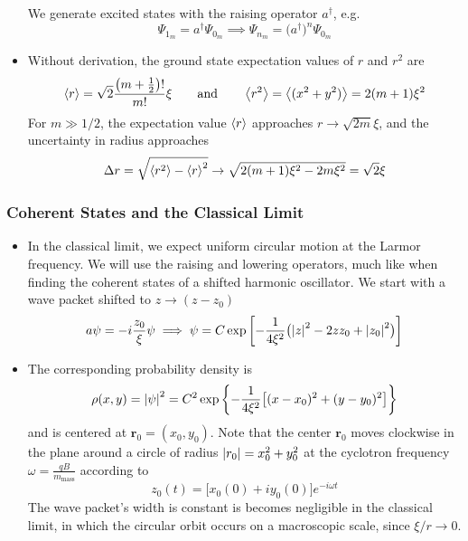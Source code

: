\documentclass[11pt, a4paper]{article}
\newcommand{\eqtext}[1]{\qquad \text{#1} \qquad}
\renewcommand{\vec}[1]{\bm{#1}}  %
\renewcommand{\r}{\vec{r}}  %
\newcommand{\p}{\psi}  %
\renewcommand{\P}{\Psi}  %
\begin{document}
\begin{itemize}
	We generate excited states with the raising operator $ a^{\dagger} $, e.g.
	\begin{equation*}
		\P_{1_{m}} = a^{\dagger}\P_{0_{m}} \implies \P_{n_{m}} = \big(a^{\dagger}\big)^{n} \P_{0_{m}}
	\end{equation*}
	
	\item Without derivation, the ground state expectation values of $ r $ and $ r^{2} $ are 
	\begin{align*}
		\ev{r} = \sqrt{2}\frac{\big(m + \tfrac{1}{2}\big)!}{m!}\xi \eqtext{and} \ev{r^{2}} = \ev{(x^{2} + y^{2})} = 2(m+1)\xi^{2}
	\end{align*}
	For $ m \gg 1/2 $, the expectation value $ \ev{r} $ approaches $ r \to \sqrt{2m}\xi $, and the uncertainty in radius approaches
	\begin{equation*}
		\Delta r = \sqrt{\ev{r^{2}} - \ev{r}^{2}} \to \sqrt{2(m+1)\xi^{2} - 2m\xi^{2}} = \sqrt{2} \xi
	\end{equation*}
	
\end{itemize}

\subsubsection{Coherent States and the Classical Limit}
\begin{itemize}
	\item In the classical limit, we expect uniform circular motion at the Larmor frequency. We will use the raising and lowering operators, much like when finding the coherent states of a shifted harmonic oscillator. We start with a wave packet shifted to $ z \to (z - z_{0}) $
	\begin{equation*}
		a \p = -i\frac{z_{0}}{\xi}\p \implies \p = C\exp\left[-\frac{1}{4\xi^{2}}\big(\abs{z}^{2} - 2zz_{0} + \abs{z_{0}}^{2}\big)\right]
	\end{equation*}

	\item The corresponding probability density is
	\begin{equation*}
		\rho(x, y) = \abs{\p}^{2} = C^{2}\exp \left\{-\frac{1}{4\xi^{2}}\big[(x - x_{0})^{2} + (y - y_{0})^{2}\big]\right\}
	\end{equation*}
	and is centered at $ \r_{0} = (x_{0}, y_{0}) $. Note that the center $ \r_{0} $ moves clockwise in the plane around a circle of radius $ \abs{r_{0}} = x_{0}^{2} + y_{0}^{2} $ at the cyclotron frequency $ \omega = \frac{qB}{m_{\text{mass}}} $ according to
	\begin{equation*}
		z_{0}(t) = \big[x_{0}(0) + i y_{0}(0)\big]e^{-i\omega t}
	\end{equation*}
	The wave packet's width is constant is becomes negligible in the classical limit, in which the circular orbit occurs on a macroscopic scale, since $ \xi/r \to 0 $.
	
\end{itemize}
\end{document}
